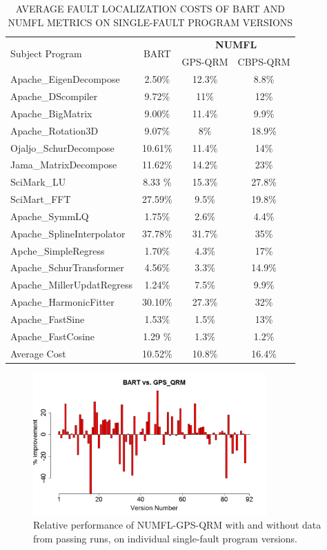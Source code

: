 \begin{table}[htbp!]
\caption{AVERAGE FAULT LOCALIZATION COSTS OF BART AND NUMFL METRICS ON SINGLE-FAULT PROGRAM VERSIONS}
\label{tableBARTvsNUMFL}
\centering
      \begin{tabular}{|l|c|c|c|}
      \hline
\multirow{2}{*}{Subject Program}	& \multirow{2}{*}{BART}&	\multicolumn{2}{|c|}{{\bf NUMFL}}	\\	\cline{3-4}
& & GPS-QRM	&CBPS-QRM \\ \hline
Apache\_EigenDecompose &	2.50\%&	12.3\%	&	8.8\%	\\	\hline
Apache\_DScompiler&	9.72\%&	11\%	&	12\%	\\	\hline
Apache\_BigMatrix	&	9.00\%&11.4\%	&	9.9\%	\\	\hline
Apache\_Rotation3D&	9.07\%&	8\%	&	18.9\%	\\	\hline
Ojaljo\_SchurDecompose&	10.61\%&	11.4\%	&	14\%	\\	\hline
Jama\_MatrixDecompose	&11.62\%&	14.2\%	&	23\%	\\	\hline
SciMark\_LU&8.33	\%&	15.3\%	&	27.8\%	\\	\hline
SciMart\_FFT&	 27.59\%&	9.5\%	&	19.8\%	\\	\hline
Apache\_SymmLQ&	 1.75\%&	2.6\%	&	4.4\%	\\	\hline
Apache\_SplineInterpolator&	 37.78\%&	31.7\%	&	35\%	\\	\hline
Apche\_SimpleRegress&	 1.70\%&	4.3\%	&	17\%	\\	\hline
Apache\_SchurTransformer&	 4.56\%&	3.3\%	&	14.9\%	\\	\hline
Apache\_MillerUpdatRegress&	 1.24\%&	7.5\%	&	9.9\%	\\	\hline
Apache\_HarmonicFitter&	30.10\%&	27.3\%	&	32\%	\\	\hline
Apache\_FastSine&	1.53\%&	1.5\%	&	13\%	\\	\hline
Apache\_FastCosine	&1.29	\%&1.3\%	&	1.2\%	\\	\hline
Average Cost	&	10.52\%&10.8\%	&	16.4\%	\\	\hline
\end{tabular}
\end{table}

\begin{figure}[!thpb]
\centering
\includegraphics[width=0.8\textwidth]{chapter4_BARTvsGPS_QRM.pdf}
\caption{Relative performance of NUMFL-GPS-QRM with and without data from passing runs, on individual single-fault program versions.}
\label{BARTvsQRM}
\end{figure}

